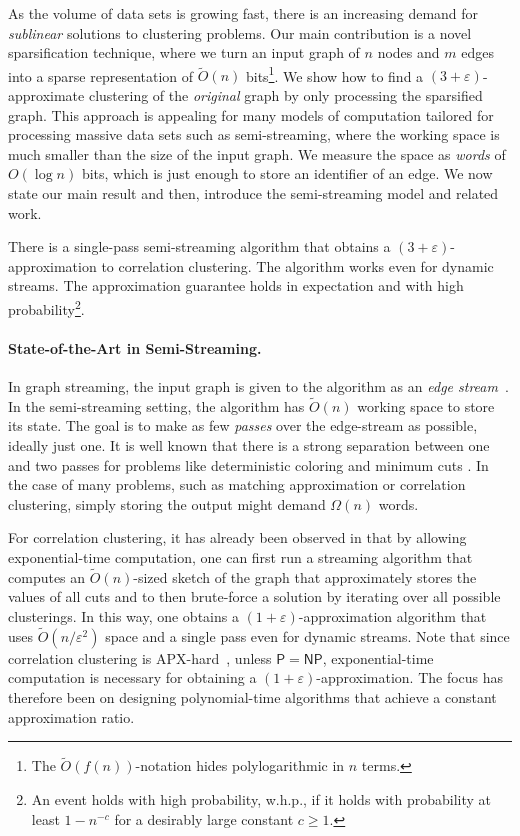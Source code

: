 \documentclass[10pt,a4paper]{article}
\newcommand{\eps}{\ensuremath{\varepsilon}}
\begin{document}
As the volume of data sets is growing fast, there is an increasing demand for \emph{sublinear} solutions to  clustering problems.
Our main contribution is a novel sparsification technique, where we turn an input graph of $n$ nodes and $m$ edges into a sparse representation of $\widetilde{O}(n)$ bits\footnote{The $\widetilde{O}(f(n))$-notation hides polylogarithmic in $n$ terms.}.
We show how to find a $(3 + \eps)$-approximate clustering of the \emph{original} graph by only processing the sparsified graph.
This approach is appealing for many models of computation tailored for processing massive data sets such as semi-streaming, where the working space is much smaller than the size of the input graph.
We measure the space as \emph{words} of $O(\log n)$ bits, which is just enough to store an identifier of an edge.
We now state our main result and then, introduce the semi-streaming model and related work.

\begin{theorem*}
    There is a single-pass semi-streaming algorithm that obtains a $(3 + \eps)$-approximation to correlation clustering. The algorithm works even for dynamic streams. The approximation guarantee holds in expectation and with high probability\footnote{An event holds with high probability, w.h.p., if it holds with probability at least $1 - n^{-c}$ for a desirably large constant $c \geq 1$.}.
\end{theorem*}


\paragraph{State-of-the-Art in Semi-Streaming.}
In graph streaming, the input graph is given to the algorithm as an \emph{edge stream}~\cite{Feigenbaum2005, Feigenbaum2005a, Mut2005}.
In the semi-streaming setting, the algorithm has $\widetilde{O}(n)$ working space to store its state.
The goal is to make as few \emph{passes} over the edge-stream as possible, ideally just one. It is well known that there is a strong separation between one and two passes for problems like deterministic coloring \cite{assadi2022deterministic} and minimum cuts \cite{AssadiD2021}.
In the case of many problems, such as matching approximation or correlation clustering, simply storing the output might demand $\Omega(n)$ words.

For correlation clustering, it has already been observed in \cite{ahn2015correlation,behnezhad2023single} that by allowing exp\-onential-time computation, one can first run a streaming algorithm that computes an $\widetilde{O}(n)$-sized sketch of the graph that approximately stores the values of all cuts \cite{AGM12} and to then brute-force a solution by iterating over all possible clusterings. 
In this way, one obtains a $(1+\eps)$-approximation algorithm that uses $\widetilde{O}(n/\eps^2)$ space and a single pass even for dynamic streams. Note that since correlation clustering is APX-hard~\cite{charikar2005clustering}, unless $\mathsf{P}=\mathsf{NP}$, exponential-time computation is necessary for obtaining a $(1+\eps)$-approximation. The focus has therefore been on designing polynomial-time algorithms that achieve a constant approximation ratio.
\end{document}
